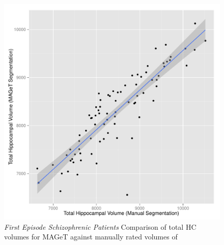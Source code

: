 \documentclass{article}\usepackage{graphicx, color}
\makeatletter
\def\maxwidth{ %
  \ifdim\Gin@nat@width>\linewidth
    \linewidth
  \else
    \Gin@nat@width
  \fi
}
\newenvironment{knitrout}{}{} %
\makeatother
\begin{document}
\begin{figure}[h]
\begin{knitrout}
\color{fgcolor}

{\centering \includegraphics[width=\maxwidth]{figure/SZ_volumes} 

}


\end{knitrout}

  \caption{{\em First Episode Schizophrenic Patients} Comparison of total HC volumes for MAGeT against manually rated volumes of}
  \label{SZ_volumes}
\end{figure}
\end{document}
